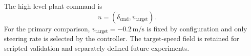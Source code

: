 The high-level plant command is
\begin{equation}
  u=(\dot{\delta}_{\mathrm{cmd}},v_{\mathrm{target}}).
\end{equation}
For the primary comparison, $v_{\mathrm{target}}=-0.2\,\mathrm{m/s}$ is fixed
by configuration and only steering rate is selected by the controller. The
target-speed field is retained for scripted validation and separately defined
future experiments.
